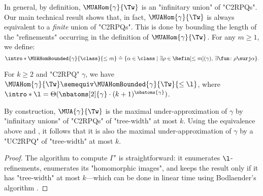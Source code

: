 In general, by definition,
$\MUAHom{\gamma}{\Tw}$ is an "infinitary union" of "C2RPQs". Our main technical result shows that,
in fact, $\MUAHom{\gamma}{\Tw}$ is always equivalent to a \emph{finite} union of "C2RPQs". This is done by bounding the length of the "refinements" occurring in the definition of $\MUAHom{\gamma}{\Tw}$.
For any $m \geq 1$, we define:
\AP
\[
    \intro*\MUAHomBounded{\gamma}{\class}{\leq m} \defeq 
    \{ 
        \alpha \in \class
        \mid
        \exists \rho \in \Refin[\leq m](\gamma),\, \exists \fun\colon \rho \surj \alpha
    \}.
\]
\newcommand{\lbound}[2]{\Theta(\nbatoms[2]{#2}\cdot ({#1}+1)^{\nbatoms{#2}})}
\begin{lemma}
    \AP\label{lemma:bound_size_refinements}
    \AP For $k \geq 2$ and "C2RPQ" $\gamma$, we have
    $\MUAHom{\gamma}{\Tw} \semequiv \MUAHomBounded{\gamma}{\Tw}{\leq\l}$, where
    $\intro*\l = \lbound{k}{\gamma}$.
\end{lemma}
By construction, $\MUA{\gamma}{\Tw}$ is the maximal under-approximation of $\gamma$ by
"infinitary unions" of "C2RPQs" of "tree-width" at most $k$. Using the equivalence above and
, it follows that
it is also the maximal under-approximation of $\gamma$ by
a "UC2RPQ" of "tree-width" at most $k$.
\muaexistseffective
\begin{proof}
	The algorithm to compute $\Gamma'$ is straightforward:
	it enumerates $\l$-refinements, enumerates its "homomorphic images",
	and keeps the result only if it has "tree-width" at most $k$---which can
	be done in linear time using Bodlaender's algorithm \cite[Theorem 1.1]{bodlaender1996treewidth}.
\end{proof}

